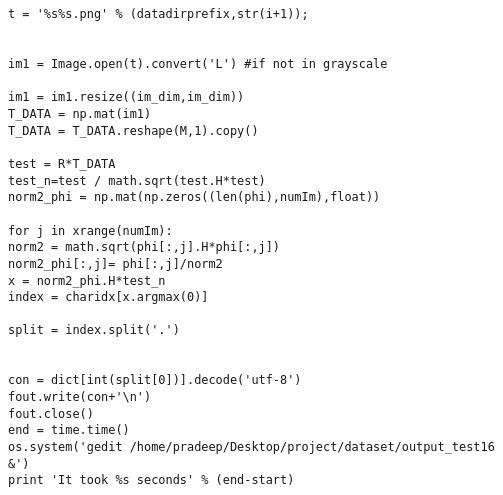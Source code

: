 \begin{verbatim}
t = '%s%s.png' % (datadirprefix,str(i+1));


im1 = Image.open(t).convert('L') #if not in grayscale

im1 = im1.resize((im_dim,im_dim))
T_DATA = np.mat(im1)
T_DATA = T_DATA.reshape(M,1).copy()

test = R*T_DATA
test_n=test / math.sqrt(test.H*test)
norm2_phi = np.mat(np.zeros((len(phi),numIm),float))

for j in xrange(numIm):
norm2 = math.sqrt(phi[:,j].H*phi[:,j])
norm2_phi[:,j]= phi[:,j]/norm2
x = norm2_phi.H*test_n
index = charidx[x.argmax(0)]

split = index.split('.')


con = dict[int(split[0])].decode('utf-8')
fout.write(con+'\n')
fout.close()
end = time.time()
os.system('gedit /home/pradeep/Desktop/project/dataset/output_test16 &')
print 'It took %s seconds' % (end-start)
\end{verbatim}
